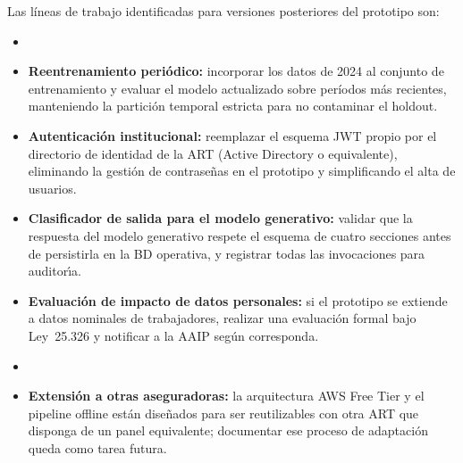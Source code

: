 Las l\'ineas de trabajo identificadas para versiones posteriores del prototipo son:
\begin{itemize}
	\item {}
	\item \textbf{Reentrenamiento peri\'odico:} incorporar los datos de 2024 al conjunto de entrenamiento y evaluar el modelo actualizado sobre per\'iodos m\'as recientes, manteniendo la partici\'on temporal estricta para no contaminar el holdout.
	\item \textbf{Autenticaci\'on institucional:} reemplazar el esquema JWT propio por el directorio de identidad de la ART (Active Directory o equivalente), eliminando la gesti\'on de contrase\~nas en el prototipo y simplificando el alta de usuarios. 
	\item \textbf{Clasificador de salida para el modelo generativo:} validar que la respuesta del modelo generativo respete el esquema de cuatro secciones antes de persistirla en la BD operativa, y registrar todas las invocaciones para auditor\'{\i}a.
	\item \textbf{Evaluaci\'on de impacto de datos personales:} si el prototipo se extiende a datos nominales de trabajadores, realizar una evaluaci\'on formal bajo Ley~25.326 y notificar a la AAIP seg\'un corresponda.
	\item {}
	\item \textbf{Extensi\'on a otras aseguradoras:} la arquitectura AWS Free Tier y el pipeline offline est\'an dise\~nados para ser reutilizables con otra ART que disponga de un panel equivalente; documentar ese proceso de adaptaci\'on queda como tarea futura.
\end{itemize}
